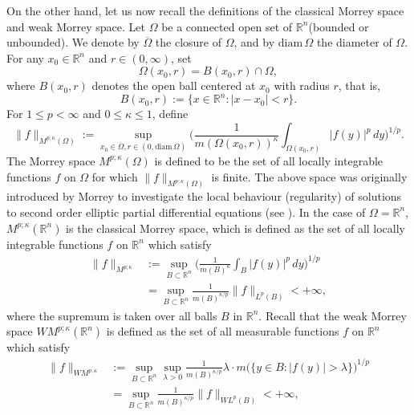 \documentclass{birkjour}
\theoremstyle{definition}
\theoremstyle{remark}
\numberwithin{equation}{section}
\begin{document}
On the other hand, let us now recall the definitions of the classical Morrey space and weak Morrey space. Let $\Omega$ be a connected open set of $\mathbb R^n$(bounded or unbounded). We denote by $\overline{\Omega}$ the closure of $\Omega$, and by $\mathrm{diam}\,\Omega$ the diameter of $\Omega$. For any $x_0\in\mathbb R^n$ and $r\in(0,\infty)$, set
\begin{equation*}
\Omega(x_0,r)=B(x_0,r)\cap\Omega,
\end{equation*}
where $B(x_0,r)$ denotes the open ball centered at $x_0$ with radius $r$, that is,
\begin{equation*}
B(x_0,r):=\big\{x\in\mathbb R^n:|x-x_0|<r\big\}.
\end{equation*}
For $1\leq p<\infty$ and $0\leq\kappa\leq1$, define
\begin{equation*}
\big\|f\big\|_{M^{p;\kappa}(\Omega)}:=\sup_{x_0\in\overline{\Omega},r\in(0,\mathrm{diam}\,\Omega)}
\bigg(\frac{1}{m(\Omega(x_0,r))^{\kappa}}\int_{\Omega(x_0,r)}|f(y)|^p\,dy\bigg)^{1/p}.
\end{equation*}
The Morrey space $M^{p;\kappa}(\Omega)$ is defined to be the set of all locally integrable functions $f$ on $\Omega$ for which $\|f\|_{M^{p;\kappa}(\Omega)}$ is finite. The above space was originally introduced by Morrey to investigate the local behaviour (regularity) of solutions to second order elliptic partial differential equations (see \cite{morrey}). In the case of $\Omega=\mathbb R^n$, $M^{p;\kappa}(\mathbb R^n)$ is the classical Morrey space, which is defined as the set of all locally integrable functions $f$ on $\mathbb R^n$ which satisfy
\begin{equation*}
\begin{split}
\|f\|_{M^{p;\kappa}}&:=\sup_{B\subset\mathbb R^n}\bigg(\frac{1}{m(B)^{\kappa}}\int_{B}|f(y)|^p\,dy\bigg)^{1/p}\\
&=\sup_{B\subset\mathbb R^n}\frac{1}{m(B)^{\kappa/p}}\|f\|_{L^{p}({B})}<+\infty,
\end{split}
\end{equation*}
where the supremum is taken over all balls $B$ in $\mathbb R^n$. Recall that the weak Morrey space $WM^{p;\kappa}(\mathbb R^n)$ is defined as the set of all measurable functions $f$ on $\mathbb R^n$ which satisfy
\begin{equation*}
\begin{split}
\|f\|_{WM^{p;\kappa}}&:=\sup_{B\subset\mathbb R^n}\sup_{\lambda>0}
\frac{1}{m(B)^{\kappa/p}}\lambda\cdot m\big(\big\{y\in B:|f(y)|>\lambda\big\}\big)^{1/p}\\
&=\sup_{B\subset\mathbb R^n}\frac{1}{m(B)^{\kappa/p}}\|f\|_{WL^{p}({B})}<+\infty,
\end{split}
\end{equation*}
\end{document}

